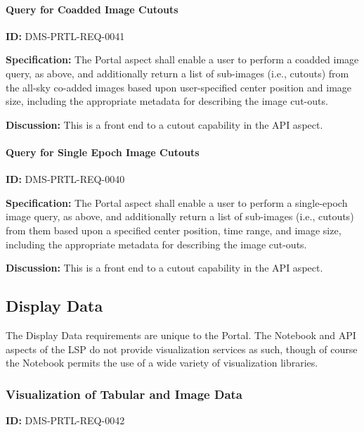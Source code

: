 \documentclass[SE,toc]{lsstdoc}
\begin{document}
\paragraph{Query for Coadded Image Cutouts}\hfill  %

\label{DMS-PRTL-REQ-0041}
\textbf{ID:} DMS-PRTL-REQ-0041

\textbf{Specification:}
The Portal aspect shall enable a user to perform a coadded image query, as above, and additionally return a list of sub-images (i.e., cutouts) from the all-sky co-added images based upon user-specified center position and image size, including the appropriate metadata for describing the image cut-outs.

\textbf{Discussion:}
This is a front end to a cutout capability in the API aspect.

\paragraph{Query for Single Epoch Image Cutouts}\hfill  %

\label{DMS-PRTL-REQ-0040}
\textbf{ID:} DMS-PRTL-REQ-0040

\textbf{Specification:}
The Portal aspect shall enable a user to perform a single-epoch image query, as above, and additionally return a list of sub-images (i.e., cutouts) from them based upon a specified center position, time range, and image size, including the appropriate metadata for describing the image cut-outs.

\textbf{Discussion:}
This is a front end to a cutout capability in the API aspect.

\subsection{Display Data}

The Display Data requirements are unique to the Portal.  The Notebook and API aspects of the LSP do not provide visualization services as such, though of course the Notebook permits the use of a wide variety of visualization libraries.

\subsubsection{Visualization of Tabular and Image Data}

\label{DMS-PRTL-REQ-0042}
\textbf{ID:} DMS-PRTL-REQ-0042
\end{document}
